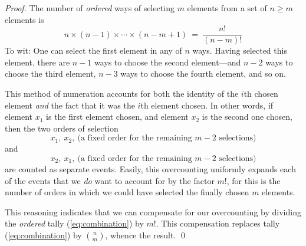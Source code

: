 \begin{proof}
The number of {\em ordered} ways of selecting $m$ elements from a set of $n \geq m$
elements is 
\begin{equation}
\label{eq:combination}
n \times (n-1) \times \cdots \times (n-m+1) \ = \ \frac{n!}{(n-m)!}
\end{equation}
To wit: One can select the first element in any of $n$ ways.  Having selected this element,
there are $n-1$ ways to choose the second element---and $n-2$ ways to choose the third
element, $n-3$ ways to choose the fourth element, and so on.

This method of numeration accounts for both the identity of the $i$th chosen element 
{\em and} the fact that it was the $i$th element chosen.  In other words, if element $x_1$
is the first element chosen,
and element $x_2$ is the second one chosen, then the two orders of selection
\[ x_1, \ x_2, \ \mbox{(a fixed order for the remaining $m-2$ selections)} \]
and 
\[ x_2, \ x_1, \ \mbox{(a fixed order for the remaining $m-2$ selections)} \]
are counted as separate events.  Easily, this overcounting uniformly expands each of the
events that we {\em do} want to account for by the factor $m!$, for this is the number of orders 
in which we could have selected the finally chosen $m$ elements.
 
This reasoning indicates that we can compensate for our overcounting by dividing the 
{\em ordered} tally (\ref{eq:combination}) by $m!$.  This compensation replaces tally
(\ref{eq:combination}) by $\displaystyle {n \choose m}$, whence the result.  \qed
\end{proof}

\medskip

\noindent {}

